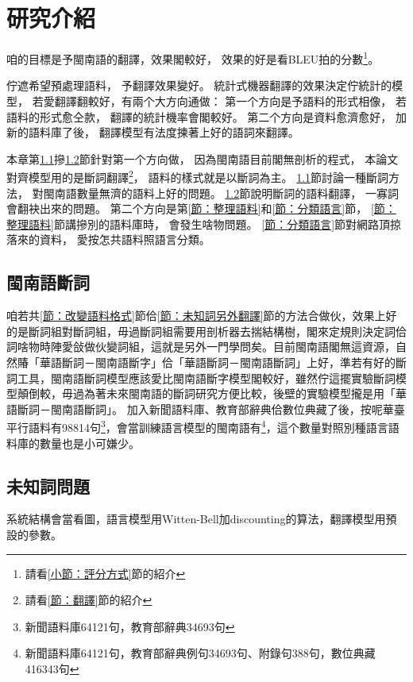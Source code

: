 
\chapter{研究介紹}
\label{章：研究介紹}

咱的目標是予閩南語的翻譯，效果閣較好，
效果的好是看BLEU拍的分數\footnote{請看\ref{小節：評分方式}節的紹介}。

佇遮希望預處理語料，
予翻譯效果變好。
統計式機器翻譯的效果決定佇統計的模型，
若愛翻譯翻較好，有兩个大方向通做：
第一个方向是予語料的形式相像，
若語料的形式愈仝款，
翻譯的統計機率會閣較好。
第二个方向是資料愈濟愈好，
加新的語料庫了後，
翻譯模型有法度揀著上好的語詞來翻譯。

本章第\ref{節：閩南語斷詞}摻\ref{節：未知詞問題}節針對第一个方向做，
因為閩南語目前閣無剖析的程式，
本論文對齊模型用的是斷詞翻譯\footnote{請看\ref{節：翻譯}節的紹介}，
語料的樣式就是以斷詞為主。
\ref{節：閩南語斷詞}節討論一種斷詞方法，
對閩南語數量無濟的語料上好的問題。
\ref{節：未知詞問題}節說明斷詞的語料翻譯，
一寡詞會翻袂出來的問題。
第二个方向是第\ref{節：整理語料}和\ref{節：分類語言}節，
\ref{節：整理語料}節講摻別的語料庫時，
會發生啥物問題。
\ref{節：分類語言}節對網路頂掠落來的資料，
愛按怎共語料照語言分類。


\section{閩南語斷詞}
\label{節：閩南語斷詞}
咱若共\ref{節：改變語料格式}節佮\ref{節：未知詞另外翻譯}節的方法合做伙，效果上好的是斷詞組對斷詞組，毋過斷詞組需要用剖析器去揣結構樹，閣來定規則決定詞佮詞啥物時陣愛敆做伙變詞組，這就是另外一門學問矣。目前閩南語閣無這資源，自然賰「華語斷詞－閩南語斷字」佮「華語斷詞－閩南語斷詞」上好，準若有好的斷詞工具，閩南語斷詞模型應該愛比閩南語斷字模型閣較好，雖然佇這擺實驗斷詞模型顛倒較，毋過為著未來閩南語的斷詞研究方便比較，後壁的實驗模型攏是用「華語斷詞－閩南語斷詞」。
加入新聞語料庫、教育部辭典佮數位典藏了後，按呢華臺平行語料有98814句\footnote{新聞語料庫64121句，教育部辭典34693句}，會當訓練語言模型的閩南語有\footnote{新聞語料庫64121句，教育部辭典例句34693句、附錄句388句，數位典藏416343句}，這个數量對照別種語言語料庫的數量也是小可嫌少。



\section{未知詞問題}
\label{節：未知詞問題}
系統結構會當看圖，語言模型用Witten-Bell加discounting的算法，翻譯模型用預設的參數。

